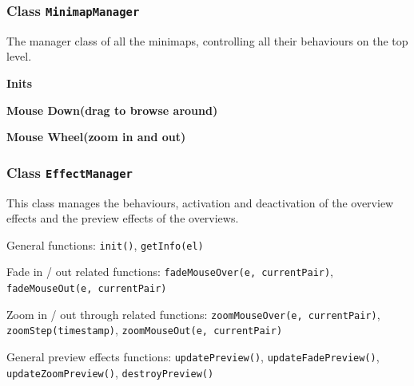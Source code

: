 



\subsubsection{Class \texttt{MinimapManager}}

The manager class of all the minimaps, controlling all their behaviours on the top level.

\textbf{Inits}




\textbf{Mouse Down(drag to browse around)}






\textbf{Mouse Wheel(zoom in and out)}






\subsubsection{Class \texttt{EffectManager}}

This class manages the behaviours, activation and deactivation of the overview effects and the preview effects of the overviews.

General functions: \texttt{init()}, \texttt{getInfo(el)}

Fade in / out related functions: \texttt{fadeMouseOver(e, currentPair)}, \texttt{fadeMouseOut(e, currentPair)}

Zoom in / out through related functions: \texttt{zoomMouseOver(e, currentPair)}, \texttt{zoomStep(timestamp)}, \texttt{zoomMouseOut(e, currentPair)}

General preview effects functions: \texttt{updatePreview()}, \texttt{updateFadePreview()}, \texttt{updateZoomPreview()}, \texttt{destroyPreview()}

